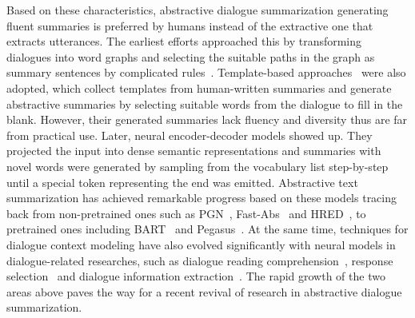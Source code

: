 Based on these characteristics, abstractive dialogue summarization generating fluent summaries is preferred by humans instead of the extractive one that extracts utterances.
The earliest efforts approached this by transforming dialogues into word graphs and selecting the suitable paths in the graph as summary sentences by complicated rules~\cite{banerjee2015generating,shang2018unsupervised}.
Template-based approaches~\cite{OyaMCN14,singla2017spoken} were also adopted, which collect templates from human-written summaries and generate abstractive summaries by selecting suitable words from the dialogue to fill in the blank. However, their generated summaries lack fluency and diversity thus are far from practical use.  
Later, neural encoder-decoder models showed up. They projected the input into dense semantic representations and summaries with novel words were generated by sampling from the vocabulary list step-by-step until a special token representing the end was emitted. Abstractive text summarization has achieved remarkable progress based on these models tracing back from 
non-pretrained ones such as PGN~\cite{see2017get}, Fast-Abs~\cite{chen2018fast} and HRED~\cite{serban2016building}, to pretrained ones including 
BART~\cite{lewis2020bart} and Pegasus~\cite{zhang2020pegasus}. 
At the same time, techniques for dialogue context modeling have also evolved significantly with neural models in dialogue-related researches, such as dialogue reading comprehension~\cite{sun2019dream}, response selection~\cite{xu2021learning} and dialogue information extraction~\cite{yu2020dialogue}.
The rapid growth of the two areas above paves the way for a recent revival of research in abstractive dialogue summarization. 






